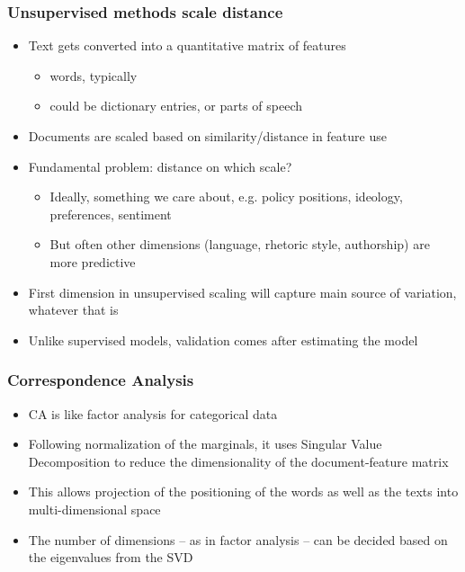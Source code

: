 \documentclass{beamer}
\begin{document}
\begin{frame}
	\frametitle{Unsupervised methods scale \alert{distance}}
	\begin{itemize}[<+->]
		\item Text gets converted into a quantitative matrix of
		\alert{features}
		\begin{itemize}
			\item words, typically
			\item could be dictionary entries, or parts of speech
		\end{itemize}
		\item Documents are scaled based on similarity/distance in feature use
		\item Fundamental problem: \alert{distance on which scale?}
		\begin{itemize}
			\item Ideally, something we care about, e.g. policy positions, ideology, preferences, sentiment
			\item But often other dimensions (language, rhetoric style, authorship) are more predictive
		\end{itemize}
		\item First dimension in unsupervised scaling will capture main source of variation, whatever that is
		\item Unlike supervised models, validation comes \alert{after} estimating the model
	\end{itemize}
\end{frame}



\begin{frame}
	\frametitle{Correspondence Analysis}  
	\begin{itemize}
		\item CA is like factor analysis for categorical data
		\item Following normalization of the marginals, it uses Singular
		Value Decomposition to reduce the dimensionality of the
		document-feature matrix
		\item This allows projection of the positioning of the words as well
		as the texts into multi-dimensional space
		\item The number of dimensions -- as in factor analysis -- can be
		decided based on the eigenvalues from the SVD
	\end{itemize}
\end{frame}
\end{document}
